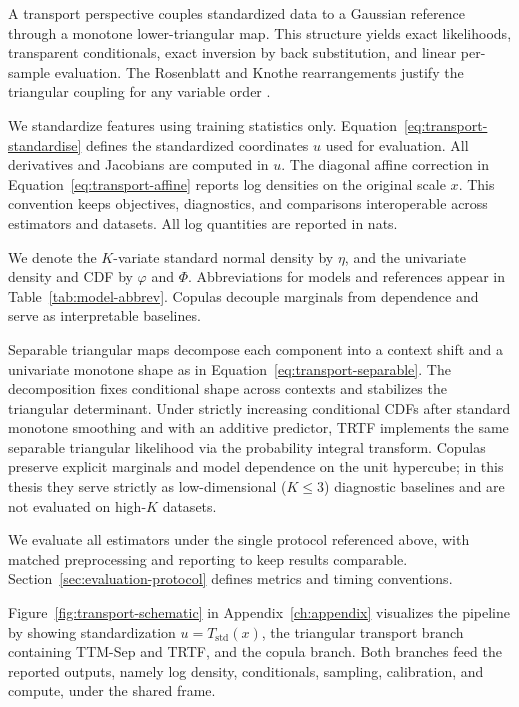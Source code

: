 \documentclass[11pt,a4paper,twoside]{book}\usepackage[]{graphicx}\usepackage[]{xcolor}
\begin{document}
A transport perspective couples standardized data to a Gaussian reference through a monotone lower-triangular map. This structure yields exact likelihoods, transparent conditionals, exact inversion by back substitution, and linear per-sample evaluation. The Rosenblatt and Knothe rearrangements justify the triangular coupling for any variable order \citep{rosenblatt1952remarks,knothe1957contributions}.
\medskip

We standardize features using training statistics only. Equation~\eqref{eq:transport-standardise} defines the standardized coordinates $u$ used for evaluation. All derivatives and Jacobians are computed in $u$. The diagonal affine correction in Equation~\eqref{eq:transport-affine} reports log densities on the original scale $x$. This convention keeps objectives, diagnostics, and comparisons interoperable across estimators and datasets. All log quantities are reported in nats.
\medskip

We denote the $K$-variate standard normal density by $\eta$, and the univariate density and CDF by $\varphi$ and $\Phi$. Abbreviations for models and references appear in Table~\ref{tab:model-abbrev}. Copulas decouple marginals from dependence and serve as interpretable baselines.
\medskip

Separable triangular maps decompose each component into a context shift and a univariate monotone shape as in Equation~\eqref{eq:transport-separable}. The decomposition fixes conditional shape across contexts and stabilizes the triangular determinant. Under strictly increasing conditional CDFs after standard monotone smoothing and with an additive predictor, TRTF implements the same separable triangular likelihood via the probability integral transform. Copulas preserve explicit marginals and model dependence on the unit hypercube; in this thesis they serve strictly as low-dimensional ($K\!\le\!3$) diagnostic baselines and are not evaluated on high-$K$ datasets.

We evaluate all estimators under the single protocol referenced above, with matched preprocessing and reporting to keep results comparable. Section~\ref{sec:evaluation-protocol} defines metrics and timing conventions.

Figure~\ref{fig:transport-schematic} in Appendix~\ref{ch:appendix} visualizes the pipeline by showing standardization $u = T_{\text{std}}(x)$, the triangular transport branch containing TTM-Sep and TRTF, and the copula branch. Both branches feed the reported outputs, namely log density, conditionals, sampling, calibration, and compute, under the shared frame.
\end{document}
